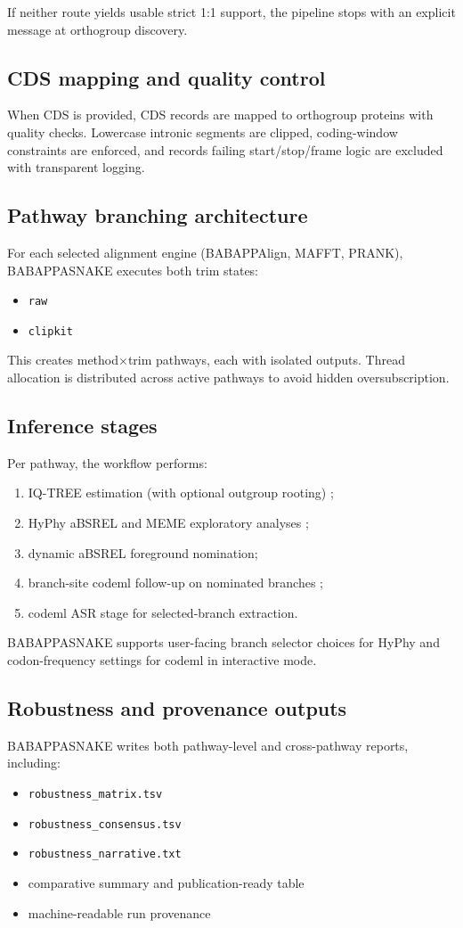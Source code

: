 \documentclass[11pt]{article}
\begin{document}
If neither route yields usable strict 1:1 support, the pipeline stops with an explicit message at orthogroup discovery.

\subsection{CDS mapping and quality control}
When CDS is provided, CDS records are mapped to orthogroup proteins with quality checks.
Lowercase intronic segments are clipped, coding-window constraints are enforced, and records failing start/stop/frame logic are excluded with transparent logging.

\subsection{Pathway branching architecture}
For each selected alignment engine (BABAPPAlign, MAFFT, PRANK), BABAPPASNAKE executes both trim states:
\begin{itemize}[leftmargin=*]
  \item \texttt{raw}
  \item \texttt{clipkit}
\end{itemize}
This creates method$\times$trim pathways, each with isolated outputs.
Thread allocation is distributed across active pathways to avoid hidden oversubscription.

\subsection{Inference stages}
Per pathway, the workflow performs:
\begin{enumerate}[leftmargin=*]
  \item IQ-TREE estimation (with optional outgroup rooting) \citep{iqtree2};
  \item HyPhy aBSREL and MEME exploratory analyses \citep{hyphy2019};
  \item dynamic aBSREL foreground nomination;
  \item branch-site codeml follow-up on nominated branches \citep{paml2007};
  \item codeml ASR stage for selected-branch extraction.
\end{enumerate}

BABAPPASNAKE supports user-facing branch selector choices for HyPhy and codon-frequency settings for codeml in interactive mode.

\subsection{Robustness and provenance outputs}
BABAPPASNAKE writes both pathway-level and cross-pathway reports, including:
\begin{itemize}[leftmargin=*]
  \item \texttt{robustness\_matrix.tsv}
  \item \texttt{robustness\_consensus.tsv}
  \item \texttt{robustness\_narrative.txt}
  \item comparative summary and publication-ready table
  \item machine-readable run provenance
\end{itemize}
\end{document}
